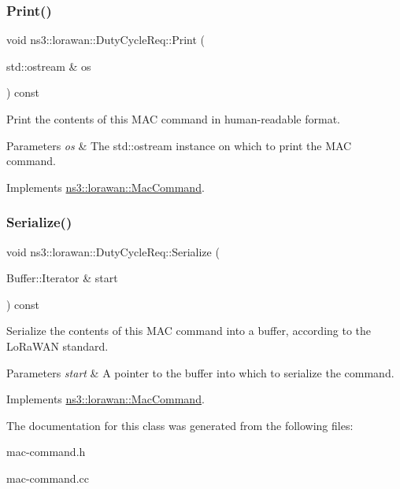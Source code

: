 \subsubsection{\texorpdfstring{Print()}{Print()}}
{\footnotesize\ttfamily void ns3\+::lorawan\+::\+Duty\+Cycle\+Req\+::\+Print (\begin{DoxyParamCaption}\item[{std\+::ostream \&}]{os }\end{DoxyParamCaption}) const\hspace{0.3cm}{\ttfamily [virtual]}}

Print the contents of this M\+AC command in human-\/readable format.


\begin{DoxyParams}{Parameters}
{\em os} & The std\+::ostream instance on which to print the M\+AC command. \\
\hline
\end{DoxyParams}


Implements \hyperlink{classns3_1_1lorawan_1_1MacCommand_a6bf88db38dab7dcd817811a9fb59f920}{ns3\+::lorawan\+::\+Mac\+Command}.

\mbox{\label{classns3_1_1lorawan_1_1DutyCycleReq_ae8bd08eaf66d3a83f4c972d6317bc7dd}} 
\subsubsection{\texorpdfstring{Serialize()}{Serialize()}}
{\footnotesize\ttfamily void ns3\+::lorawan\+::\+Duty\+Cycle\+Req\+::\+Serialize (\begin{DoxyParamCaption}\item[{Buffer\+::\+Iterator \&}]{start }\end{DoxyParamCaption}) const\hspace{0.3cm}{\ttfamily [virtual]}}

Serialize the contents of this M\+AC command into a buffer, according to the Lo\+Ra\+W\+AN standard.


\begin{DoxyParams}{Parameters}
{\em start} & A pointer to the buffer into which to serialize the command. \\
\hline
\end{DoxyParams}


Implements \hyperlink{classns3_1_1lorawan_1_1MacCommand_a0ed44b33942ddc3dc9694dc06ab0b87f}{ns3\+::lorawan\+::\+Mac\+Command}.



The documentation for this class was generated from the following files\+:\begin{DoxyCompactItemize}
\item 
mac-\/command.\+h\item 
mac-\/command.\+cc\end{DoxyCompactItemize}
